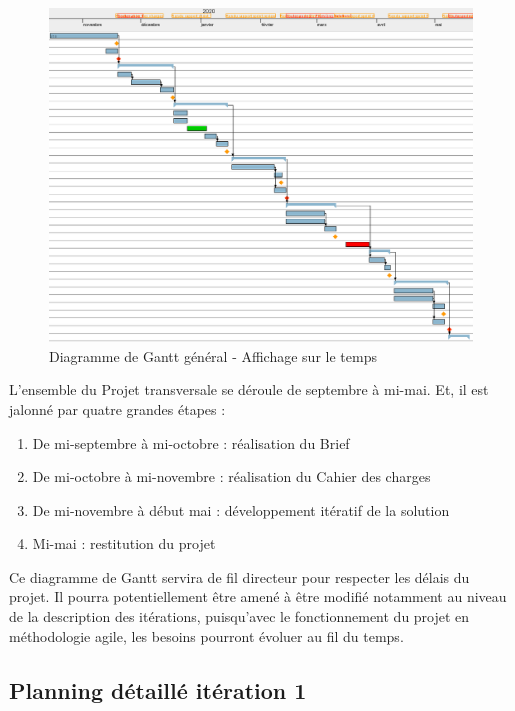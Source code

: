 \documentclass[12pt,titlepage,french]{article}
\begin{document}
\begin{figure} [!hbtp]
 \centering
    \caption{Diagramme de Gantt général - Affichage sur le temps}
    \label{Diagramme de Gantt général - Affichage sur le temps}
    \includegraphics[scale=0.6, origin=c]{img_gantt/affichage_gantt_general.PNG}
\end{figure}

L'ensemble du Projet transversale se déroule de septembre à mi-mai. Et, il est jalonné par quatre grandes étapes :
\begin{enumerate}
\item De mi-septembre à mi-octobre : réalisation du Brief
\item De mi-octobre à mi-novembre : réalisation du Cahier des charges
\item De mi-novembre à début mai : développement itératif de la solution
\item Mi-mai : restitution du projet
\end{enumerate}

Ce diagramme de Gantt servira de fil directeur pour respecter les délais du projet. Il pourra potentiellement être amené à être modifié notamment au niveau de la description des itérations, puisqu'avec le fonctionnement du projet en méthodologie agile, les besoins pourront évoluer au fil du temps.

\subsection*{Planning détaillé itération 1}
\end{document}
